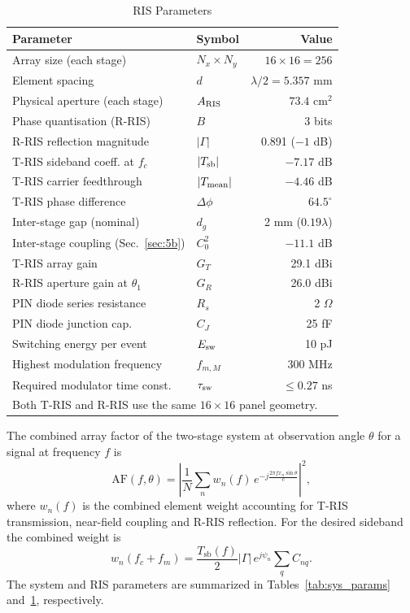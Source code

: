 \documentclass[journal]{IEEEtran}
\newcommand{\Tris}{T-RIS}
\newcommand{\Rris}{R-RIS}
\begin{document}
\begin{table}[!t]
\renewcommand{\arraystretch}{1.15}
\caption{RIS Parameters}
\label{tab:ris_params}
\centering
\begin{tabular}{l l r}
\hline\hline
Parameter & Symbol & Value \\
\hline
Array size (each stage) & $N_x \times N_y$ & $16\times16 = 256$ \\
Element spacing & $d$ & $\lambda/2 = 5.357$ mm \\
Physical aperture (each stage) & $A_{\rm RIS}$ & $73.4$ cm$^2$ \\
Phase quantisation (\Rris) & $B$ & 3 bits \\
\Rris{} reflection magnitude & $|\Gamma|$ & 0.891 ($-1$ dB) \\
\Tris{} sideband coeff. at $f_c$ & $|T_{\rm sb}|$ & $-7.17$ dB \\
\Tris{} carrier feedthrough & $|T_{\rm mean}|$ & $-4.46$ dB \\
\Tris{} phase difference & $\Delta\phi$ & $64.5^\circ$ \\
Inter-stage gap (nominal) & $d_g$ & 2 mm ($0.19\lambda$) \\
Inter-stage coupling (Sec.~\ref{sec:5b}) & $C_0^2$ & $-11.1$ dB \\
\Tris{} array gain & $G_T$ & 29.1 dBi \\
\Rris{} aperture gain at $\theta_1$ & $G_R$ & 26.0 dBi \\
PIN diode series resistance & $R_s$ & 2 $\Omega$ \\
PIN diode junction cap. & $C_J$ & 25 fF \\
Switching energy per event & $E_{\rm sw}$ & 10 pJ \\
Highest modulation frequency & $f_{m,M}$ & 300 MHz \\
Required modulator time const. & $\tau_{\rm sw}$ & $\le 0.27$ ns \\ 
\hline\hline
\multicolumn{3}{l}{\footnotesize Both \Tris{} and \Rris{} use the same $16\times16$ panel geometry.} \\
\hline
\end{tabular}
\end{table}

The combined array factor of the two-stage system at observation angle
$\theta$ for a signal at frequency $f$ is
\begin{equation}
\mathrm{AF}(f,\theta) =
\left|\frac{1}{N}\sum_n w_n(f)\,
e^{-j\frac{2\pi f x_n \sin\theta}{c}}\right|^2,
\label{eq:AF}
\end{equation}
where $w_n(f)$ is the combined element weight accounting for \Tris{}
transmission, near-field coupling and \Rris{} reflection. For the desired
sideband the combined weight is~\cite{balanis2016antenna,an2025stacked}
\begin{equation}
w_n(f_c + f_m) = \frac{T_{\mathrm{sb}}(f)}{2}
|\Gamma|\,e^{j\psi_n}\sum_q C_{nq}.
\label{eq:wn}
\end{equation}
The system and RIS parameters are summarized in Tables~\ref{tab:sys_params} and~\ref{tab:ris_params}, respectively.
\end{document}
